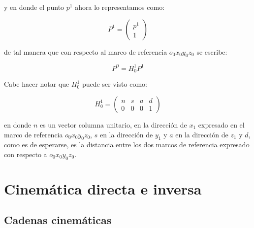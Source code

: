 \begin{multicols*}{3}
            y en donde el punto $p^1$ ahora lo representamos como:

            \begin{equation}
                P^1 =
                \begin{pmatrix}
                    p^1 \\
                    1
                \end{pmatrix}
            \end{equation}

            de tal manera que con respecto al marco de referencia $o_0 x_0 y_0 z_0$ se escribe:

            \begin{equation}
                P^0 = H_0^1 P^1
            \end{equation}

            Cabe hacer notar que $H_0^1$ puede ser visto como:

            \begin{equation}
                H_0^1 =
                \begin{pmatrix}
                    n & s & a & d \\
                    0 & 0 & 0 & 1
                \end{pmatrix}
            \end{equation}

            en donde $n$ es un vector columna unitario, en la dirección de $x_1$ expresado en el marco de referencia $o_0 x_0 y_0 z_0$, $s$ en la dirección de $y_1$ y $a$ en la dirección de $z_1$ y $d$, como es de esperarse, es la distancia entre los dos marcos de referencia expresado con respecto a $o_0 x_0 y_0 z_0$.


    \section{Cinemática directa e inversa}


        \subsection{Cadenas cinemáticas}


\end{multicols*}
